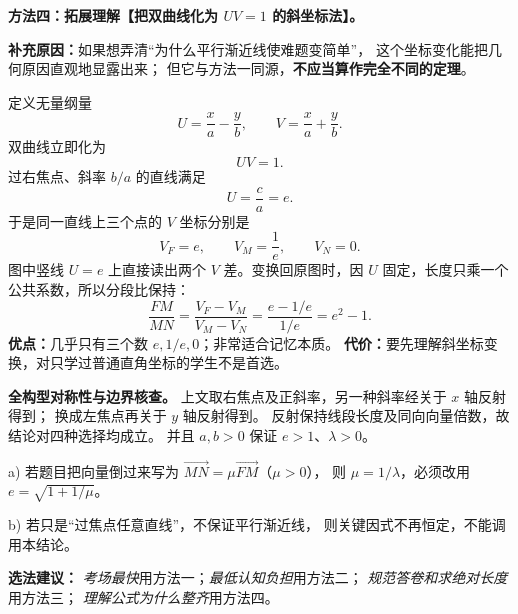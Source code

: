 \clearpage
\begin{proofbox}
\textbf{方法四：拓展理解【把双曲线化为 $UV=1$ 的斜坐标法】。}

\textbf{补充原因：}如果想弄清“为什么平行渐近线使难题变简单”，
这个坐标变化能把几何原因直观地显露出来；
但它与方法一同源，\textbf{不应当算作完全不同的定理}。

\begin{center}\end{center}

定义无量纲量
\[
U=\frac xa-\frac yb,\qquad V=\frac xa+\frac yb.
\]
双曲线立即化为
\[
\boxed{UV=1}.
\]
过右焦点、斜率 $b/a$ 的直线满足
\[
\boxed{U=\frac ca=e}.
\]
于是同一直线上三个点的 $V$ 坐标分别是
\[
V_F=e,\qquad V_M=\frac1e,\qquad V_N=0.
\]
图中竖线 $U=e$ 上直接读出两个 $V$ 差。变换回原图时，因 $U$ 固定，长度只乘一个公共系数，所以分段比保持：
\[
\frac{FM}{MN}
=\frac{V_F-V_M}{V_M-V_N}
=\frac{e-1/e}{1/e}
=\boxed{e^2-1}.
\]
\textbf{优点：}几乎只有三个数 $e,1/e,0$；非常适合记忆本质。
\textbf{代价：}要先理解斜坐标变换，对只学过普通直角坐标的学生不是首选。

\medskip
\textbf{全构型对称性与边界核查。}
上文取右焦点及正斜率，另一种斜率经关于 $x$ 轴反射得到；
换成左焦点再关于 $y$ 轴反射得到。
反射保持线段长度及同向向量倍数，故结论对四种选择均成立。
并且 $a,b>0$ 保证 $e>1$、$\lambda>0$。

a) 若题目把向量倒过来写为
$\overrightarrow{MN}=\mu\overrightarrow{FM}$（$\mu>0$），
则 $\mu=1/\lambda$，必须改用 $e=\sqrt{1+1/\mu}$。

b) 若只是“过焦点任意直线”，不保证平行渐近线，
则关键因式不再恒定，不能调用本结论。

\medskip
\textbf{选法建议：}
\emph{考场最快}用方法一；\emph{最低认知负担}用方法二；
\emph{规范答卷和求绝对长度}用方法三；
\emph{理解公式为什么整齐}用方法四。
\end{proofbox}
